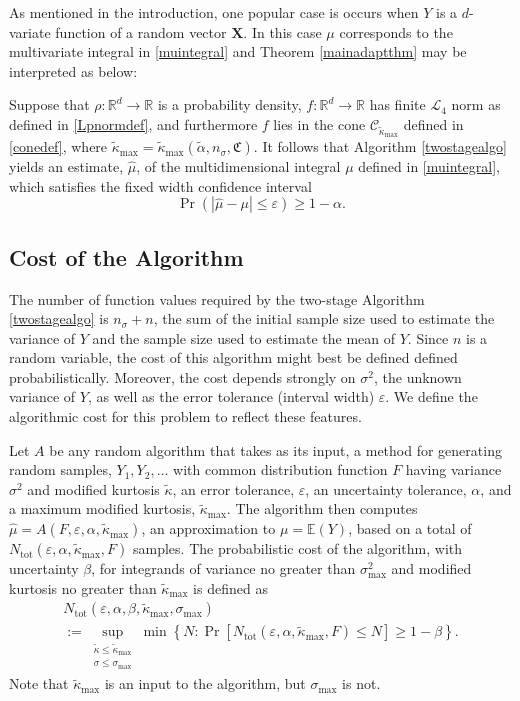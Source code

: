 \documentclass[graybox]{svmult}
\newcommand{\fudge}{\mathfrak{C}}
\newcommand\reals{\mathbb{R}}
\newcommand\e{\mathbb{E}}
\newcommand{\vX}{\boldsymbol{X}}
\newcommand{\Prob}{\Pr}
\newcommand{\hmu}{\hat{\mu}}
\newcommand{\tkappa}{\tilde{\kappa}}
\newcommand{\cc}{\mathcal{C}}
\newcommand{\cl}{\mathcal{L}}
\begin{document}
As mentioned in the introduction, one popular case is occurs when  $Y$ is a $d$-variate function of a random vector $\vX$. In this case $\mu$ corresponds to the multivariate integral in \eqref{muintegral} and Theorem \ref{mainadaptthm} may be interpreted as below:

\begin{corollary} Suppose that $\rho:\reals^d \to \reals$ is a probability density, $f: \reals^d \to \reals$ has finite $\cl_4$ norm as defined in \eqref{Lpnormdef}, and furthermore $f$ lies in the cone $\cc_{\tkappa_{\max}}$ defined in \eqref{conedef}, where $\tkappa_{\max}=\tilde\kappa_{\max}(\tilde\alpha,n_\sigma,\fudge)$.  It follows that Algorithm  \ref{twostagealgo}  yields an estimate,
$\hat\mu$, of the multidimensional integral $\mu$ defined in \eqref{muintegral}, which satisfies the fixed width confidence interval
$$\Pr( |\hat\mu-\mu|\le\varepsilon)\ge 1-\alpha.$$
\end{corollary}


\subsection{Cost of the Algorithm}  The number of function values required by the two-stage Algorithm \ref{twostagealgo} is $n_{\sigma}+n$, the sum of the initial sample size used to estimate the variance of $Y$ and the sample size used to estimate the mean of $Y$.  Since $n$ is a random variable, the cost of this algorithm might best be defined defined probabilistically.  Moreover, the cost depends strongly on $\sigma^2$, the unknown variance of $Y$, as well as the error tolerance (interval width) $\varepsilon$.  We define the algorithmic cost for this problem to reflect these features. 

Let $A$ be any random algorithm that takes as its input, a method for generating random samples, $Y_1, Y_2, \ldots $ with common distribution function $F$ having variance $\sigma^2$ and modified kurtosis $\tkappa$, an error tolerance, $\varepsilon$, an uncertainty tolerance, $\alpha$, and a maximum modified kurtosis, $\tkappa_{\max}$.  The algorithm then computes $\hmu=A(F,\varepsilon,\alpha,\tkappa_{\max})$, an approximation to $\mu=\e(Y)$, based on a total of $N_{\text{tot}}(\varepsilon,\alpha,\tkappa_{\max},F)$ samples. The probabilistic cost of the algorithm, with uncertainty $\beta$, for integrands of variance no greater than $\sigma^2_{\max}$ and modified kurtosis no greater than $\tkappa_{\max}$ is defined as 
\begin{multline}
N_{\text{tot}}(\varepsilon,\alpha,\beta,\tkappa_{\max},\sigma_{\max}) \\
:= \sup_{\substack{\tkappa \le \tkappa_{\max} \\ \sigma \le \sigma_{\max}} } \min\left\{N : \Prob[N_{\text{tot}}(\varepsilon,\alpha,\tkappa_{\max},F) \le N] \ge 1-\beta  \right \}.
\end{multline}
Note that $\tkappa_{\max}$ is an input to the algorithm, but $\sigma_{\max}$ is not.
\end{document}
